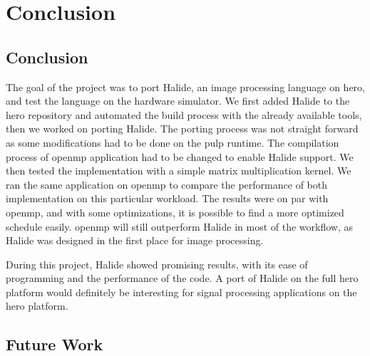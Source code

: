 \chapter{Conclusion}


\section{Conclusion}

    The goal of the project was to port Halide, an image processing language on \gls{hero}, and test the language on the hardware simulator.
    We first added Halide to the \gls{hero} repository and automated the build process with the already available tools, then we worked on porting Halide.
    The porting process was not straight forward as some modifications had to be done on the \gls{pulp} runtime.
    The compilation process of \gls{openmp} application had to be changed to enable Halide support.
    We then tested the implementation with a simple matrix multiplication kernel.
    We ran the same application on \gls{openmp} to compare the performance of both implementation on this particular workload.
    The results were on par with \gls{openmp}, and with some optimizations, it is possible to find a more optimized schedule easily.
    \Gls{openmp} will still outperform Halide in most of the workflow, as Halide was designed in the first place for image processing.

    During this project, Halide showed promising results, with its ease of programming and the performance of the code.
    A port of Halide on the full \gls{hero} platform would definitely be interesting for signal processing applications on the \gls{hero} platform.

\section{Future Work}

